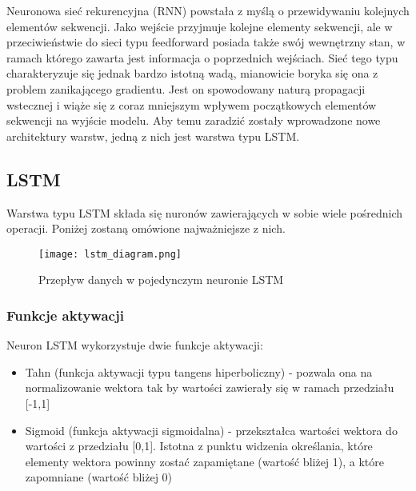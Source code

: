 Neuronowa sieć rekurencyjna (RNN) powstała z myślą o przewidywaniu kolejnych elementów sekwencji. Jako wejście przyjmuje kolejne elementy sekwencji, ale w przeciwieństwie do sieci typu feedforward posiada także swój wewnętrzny  stan, w ramach którego zawarta jest informacja o poprzednich wejściach. Sieć tego typu charakteryzuje się jednak bardzo istotną wadą, mianowicie boryka się ona z problem zanikającego gradientu. Jest on spowodowany naturą propagacji wstecznej i wiąże się z coraz mniejszym wpływem początkowych elementów sekwencji na wyjście modelu. Aby temu zaradzić zostały wprowadzone nowe architektury warstw, jedną z nich jest warstwa typu LSTM.




\subsection{\label{lstm_subsection}LSTM}




Warstwa typu LSTM składa się nuronów zawierających w sobie wiele pośrednich operacji. Poniżej zostaną omówione najważniejsze z nich.

\begin{figure}[!h]
    \label{fig:lstm_diagram}
    \centering \texttt{[image: lstm\_diagram.png]}
    \caption{Przepływ danych w pojedynczym neuronie LSTM}
\end{figure}




\subsubsection{Funkcje aktywacji}

Neuron LSTM wykorzystuje dwie funkcje aktywacji:

\begin{itemize}
    \item Tahn (funkcja aktywacji typu tangens hiperboliczny) - pozwala ona na normalizowanie wektora tak by wartości zawierały się w ramach przedziału [-1,1]
    \item Sigmoid (funkcja aktywacji sigmoidalna) - przekształca wartości wektora do wartości z przedziału [0,1]. Istotna z punktu widzenia określania, które elementy wektora powinny zostać zapamiętane (wartość bliżej 1), a które zapomniane (wartość bliżej 0)
\end{itemize}


